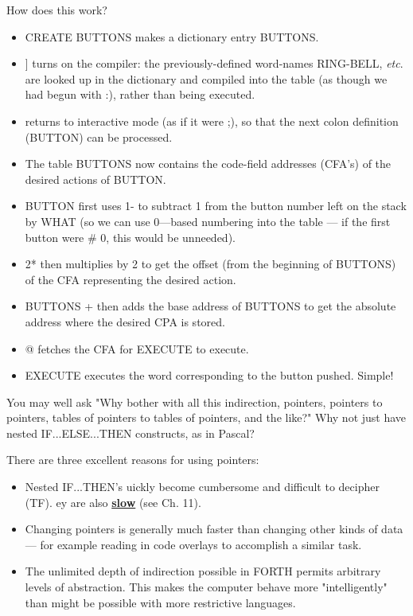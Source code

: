 How does this work?
\begin{itemize}
    \item CREATE BUTTONS makes a dictionary entry BUTTONS.
    \item ] turns on the compiler: the previously-defined word-names RING-BELL, \textit{etc}. are looked up in the dictionary and compiled into the table (as though we had begun with :), rather than being executed.
    \item  returns to interactive mode (as if it were ;), so that the next colon definition (BUTTON) can be processed.
    \item The table BUTTONS now contains the code-field addresses (CFA’s) of the desired actions of BUTTON.
    \item BUTTON first uses 1- to subtract 1 from the button number left on the stack by WHAT (so we can use 0—based numbering into the table — if the first button were \# 0, this would be unneeded).
    \item 2* then multiplies by 2 to get the offset (from the beginning of BUTTONS) of the CFA representing the desired action.
    \item BUTTONS + then adds the base address of BUTTONS to get the absolute address where the desired CPA is stored.
    \item @ fetches the CFA for EXECUTE to execute.
    \item EXECUTE executes the word corresponding to the button pushed. Simple!
\end{itemize}

You may well ask "Why bother with all this indirection, pointers, pointers to pointers, tables of pointers to tables of pointers, and the like?" Why not just have nested IF...ELSE...THEN constructs, as in Pascal?

There are three excellent reasons for using pointers:
\begin{itemize}
    \item Nested IF...THEN’s uickly become cumbersome and difficult to decipher (TF). ey are also \underline{\textbf{slow}} (see Ch. 11).
    \item Changing pointers is generally much faster than changing other kinds of data — for example reading in code overlays to accomplish a similar task.
    \item The unlimited depth of indirection possible in FORTH permits arbitrary levels of abstraction. This makes the computer behave more "intelligently" than might be possible with more restrictive languages.
\end{itemize}


